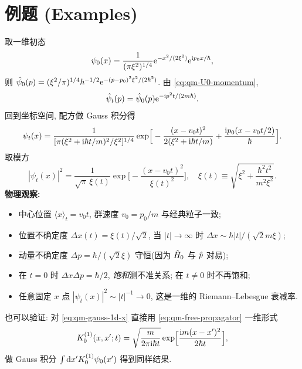 \section{例题 (Examples)}\label{sec:qm-examples}

\begin{example}\label{ex:qm-1d-gauss}
取一维初态
\begin{equation}
\psi_{0}(x)=\frac{1}{(\pi\xi^{2})^{1/4}}\mathrm{e}^{-x^{2}/(2\xi^{2})}\mathrm{e}^{\mathrm{i} p_{0}x/\hbar},
\end{equation}
则 $\hat\psi_{0}(p)=(\xi^{2}/\pi)^{1/4}\hbar^{-1/2}\mathrm{e}^{-(p-p_{0})^{2}\xi^{2}/(2\hbar^{2})}$. 由 \eqref{eq:qm-U0-momentum},
\begin{equation}
\hat\psi_{t}(p)=\hat\psi_{0}(p)\mathrm{e}^{-\mathrm{i} p^{2} t/(2m\hbar)}.
\end{equation}
回到坐标空间, 配方做 Gauss 积分得
\begin{equation}\label{eq:qm-gauss-1d-x}
\psi_{t}(x)=\frac{1}{[\pi(\xi^{2}+\mathrm{i}\hbar t/m)^{2}/\xi^{2}]^{1/4}}\exp\!\Big[-\frac{(x-v_{0}t)^{2}}{2(\xi^{2}+\mathrm{i}\hbar t/m)}+\frac{\mathrm{i} p_{0}(x-v_{0}t/2)}{\hbar}\Big].
\end{equation}
取模方
\begin{equation}\label{eq:qm-gauss-1d-mod}
|\psi_{t}(x)|^{2}=\frac{1}{\sqrt{\pi}\,\xi(t)}\exp\!\Big[-\frac{(x-v_{0}t)^{2}}{\xi(t)^{2}}\Big],\quad \xi(t)\equiv\sqrt{\xi^{2}+\frac{\hbar^{2}t^{2}}{m^{2}\xi^{2}}}.
\end{equation}
\textbf{物理观察:}
\begin{itemize}
    \item 中心位置 $\langle x\rangle_{t}=v_{0}t$, 群速度 $v_{0}=p_{0}/m$ 与经典粒子一致;
    \item 位置不确定度 $\Delta x(t)=\xi(t)/\sqrt{2}$, 当 $|t|\to\infty$ 时 $\Delta x\sim\hbar|t|/(\sqrt{2}m\xi)$;
    \item 动量不确定度 $\Delta p=\hbar/(\sqrt{2}\xi)$ 守恒(因为 $\hat{H}_{0}$ 与 $\hat{p}$ 对易);
    \item 在 $t=0$ 时 $\Delta x\Delta p=\hbar/2$, \emph{饱和}测不准关系; 在 $t\neq 0$ 时不再饱和;
    \item 任意固定 $x$ 点 $|\psi_{t}(x)|^{2}\sim |t|^{-1}\to 0$, 这是一维的 Riemann--Lebesgue 衰减率.
\end{itemize}

也可以验证: 对 \eqref{eq:qm-gauss-1d-x} 直接用 \eqref{eq:qm-free-propagator} 一维形式
\[K_{0}^{(1)}(x,x';t)=\sqrt{\frac{m}{2\pi\mathrm{i}\hbar t}}\exp\!\Big[\frac{\mathrm{i} m(x-x')^{2}}{2\hbar t}\Big],\]
做 Gauss 积分 $\int\mathrm{d} x' K_{0}^{(1)}\psi_{0}(x')$ 得到同样结果.
\end{example}

